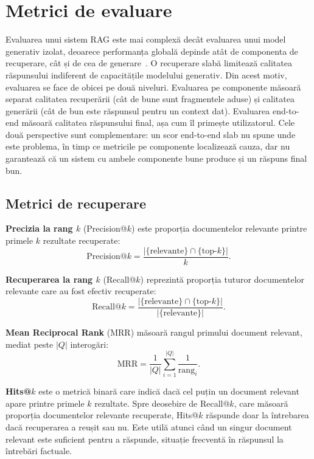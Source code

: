 \section{Metrici de evaluare}

Evaluarea unui sistem RAG este mai complexă decât evaluarea unui model generativ izolat, deoarece performanța globală depinde atât de componenta de recuperare, cât și de cea de generare~\cite{gao2024retrievalaugmentedgenerationlargelanguage}. O recuperare slabă limitează calitatea răspunsului indiferent de capacitățile modelului generativ. Din acest motiv, evaluarea se face de obicei pe două niveluri. Evaluarea pe componente măsoară separat calitatea recuperării (cât de bune sunt fragmentele aduse) și calitatea generării (cât de bun este răspunsul pentru un context dat). Evaluarea end-to-end măsoară calitatea răspunsului final, așa cum îl primește utilizatorul. Cele două perspective sunt complementare: un scor end-to-end slab nu spune unde este problema, în timp ce metricile pe componente localizează cauza, dar nu garantează că un sistem cu ambele componente bune produce și un răspuns final bun.

\subsection{Metrici de recuperare}

\textbf{Precizia la rang $k$} (Precision@$k$) este proporția documentelor relevante printre primele $k$ rezultate recuperate:
\begin{equation}
\text{Precision@}k = \frac{|\{\text{relevante}\} \cap \{\text{top-}k\}|}{k}.
\label{eq:precision}
\end{equation}

\textbf{Recuperarea la rang $k$} (Recall@$k$) reprezintă proporția tuturor documentelor relevante care au fost efectiv recuperate:
\begin{equation}
\text{Recall@}k = \frac{|\{\text{relevante}\} \cap \{\text{top-}k\}|}{|\{\text{relevante}\}|}.
\label{eq:recall}
\end{equation}

\textbf{Mean Reciprocal Rank} (MRR) măsoară rangul primului document relevant, mediat peste $|Q|$ interogări:
\begin{equation}
\text{MRR} = \frac{1}{|Q|} \sum_{i=1}^{|Q|} \frac{1}{\text{rang}_i}.
\label{eq:mrr}
\end{equation}

\textbf{Hits@$k$} este o metrică binară care indică dacă cel puțin un document relevant apare printre primele $k$ rezultate. Spre deosebire de Recall@$k$, care măsoară proporția documentelor relevante recuperate, Hits@$k$ răspunde doar la întrebarea dacă recuperarea a reușit sau nu. Este utilă atunci când un singur document relevant este suficient pentru a răspunde, situație frecventă în răspunsul la întrebări factuale.

